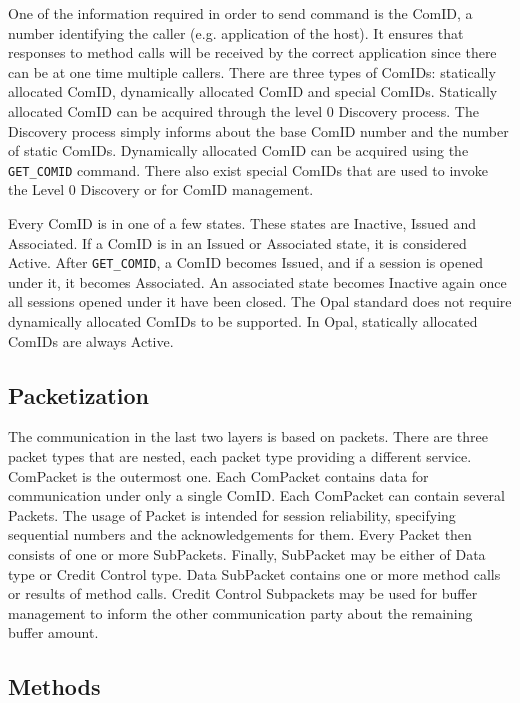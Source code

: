 One of the information required in order to send command is the ComID, a number identifying the caller (e.g. application of the host). It ensures that responses to method calls will be received by the correct application since there can be at one time multiple callers. 
There are three types of ComIDs: statically allocated ComID, dynamically allocated ComID and special ComIDs.
Statically allocated ComID can be acquired through the level 0 Discovery process. The Discovery process simply informs about the base ComID number and the number of static ComIDs.
Dynamically allocated ComID can be acquired using the \verb|GET_COMID| command.
There also exist special ComIDs that are used to invoke the Level 0 Discovery or for ComID management.

Every ComID is in one of a few states. These states are Inactive, Issued and Associated. If a ComID is in an Issued or Associated state, it is considered Active. After \verb|GET_COMID|, a ComID becomes Issued, and if a session is opened under it, it becomes Associated. An associated state becomes Inactive again once all sessions opened under it have been closed.
The Opal standard does not require dynamically allocated ComIDs to be supported.
In Opal, statically allocated ComIDs are always Active.

\subsection{Packetization}

The communication in the last two layers is based on packets. There are three packet types that are nested, each packet type providing a different service.
ComPacket is the outermost one. Each ComPacket contains data for communication under only a single ComID. Each ComPacket can contain several Packets. The usage of Packet is intended for session reliability, specifying sequential numbers and the acknowledgements for them. Every Packet then consists of one or more SubPackets. Finally, SubPacket may be either of Data type or Credit Control type. Data SubPacket contains one or more method calls or results of method calls. Credit Control Subpackets may be used for buffer management to inform the other communication party about the remaining buffer amount.

\subsection{Methods}


